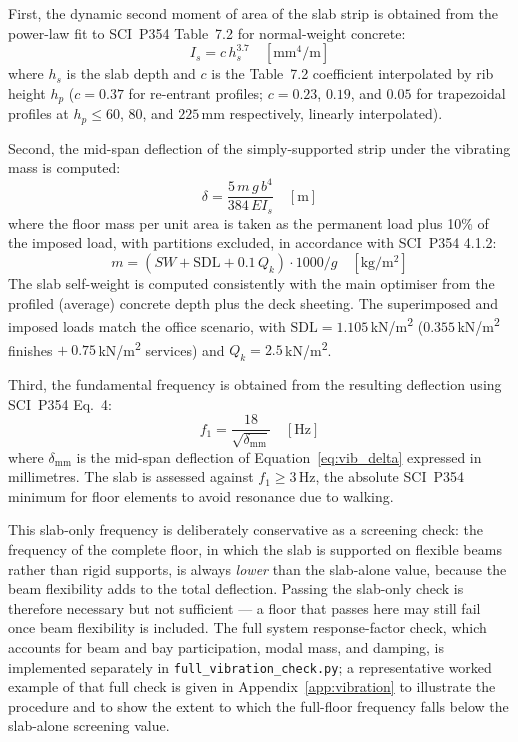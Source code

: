First, the dynamic second moment of area of the slab strip is obtained from the power-law fit to SCI~P354 Table~7.2 for normal-weight concrete:
\begin{equation}
    I_s = c\, h_s^{3.7} \quad [\mathrm{mm^4/m}]
    \label{eq:vib_Is}
\end{equation}
where $h_s$ is the slab depth and $c$ is the Table~7.2 coefficient interpolated by rib height $h_p$ ($c = 0.37$ for re-entrant profiles; $c = 0.23$, $0.19$, and $0.05$ for trapezoidal profiles at $h_p \le 60$, $80$, and $225$\,mm respectively, linearly interpolated).
 
Second, the mid-span deflection of the simply-supported strip under the vibrating mass is computed:
\begin{equation}
    \delta = \frac{5\, m\, g\, b^4}{384\, EI_s} \quad [\mathrm{m}]
    \label{eq:vib_delta}
\end{equation}
where the floor mass per unit area is taken as the permanent load plus 10\% of the imposed load, with partitions excluded, in accordance with SCI~P354 4.1.2:
\begin{equation}
    m = \left(SW + \mathrm{SDL} + 0.1\, Q_k\right) \cdot 1000 / g \quad [\mathrm{kg/m^2}]
    \label{eq:vib_mass}
\end{equation}
The slab self-weight is computed consistently with the main optimiser from the profiled (average) concrete depth plus the deck sheeting. The superimposed and imposed loads match the office scenario, with $\mathrm{SDL} = 1.105$\,kN/m\textsuperscript{2} ($0.355$\,kN/m\textsuperscript{2} finishes $+\ 0.75$\,kN/m\textsuperscript{2} services) and $Q_k = 2.5$\,kN/m\textsuperscript{2}.
 
Third, the fundamental frequency is obtained from the resulting deflection using SCI~P354 Eq.~4:
\begin{equation}
    f_1 = \frac{18}{\sqrt{\delta_\mathrm{mm}}} \quad [\mathrm{Hz}]
    \label{eq:vib_f1}
\end{equation}
where $\delta_\mathrm{mm}$ is the mid-span deflection of Equation~\eqref{eq:vib_delta} expressed in millimetres. The slab is assessed against $f_1 \ge 3$\,Hz, the absolute SCI~P354 minimum for floor elements to avoid resonance due to walking.
 
This slab-only frequency is deliberately conservative as a screening check: the frequency of the complete floor, in which the slab is supported on flexible beams rather than rigid supports, is always \emph{lower} than the slab-alone value, because the beam flexibility adds to the total deflection. Passing the slab-only check is therefore necessary but not sufficient --- a floor that passes here may still fail once beam flexibility is included. The full system response-factor check, which accounts for beam and bay participation, modal mass, and damping, is implemented separately in \texttt{full\_vibration\_check.py}; a representative worked example of that full check is given in Appendix~\ref{app:vibration} to illustrate the procedure and to show the extent to which the full-floor frequency falls below the slab-alone screening value.
 
